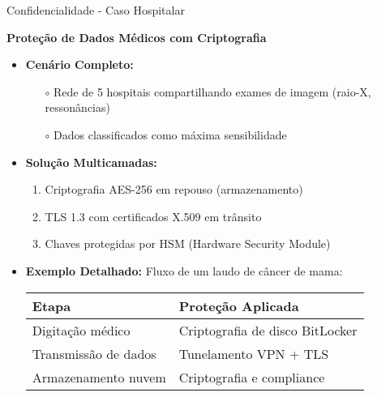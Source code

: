 \begin{frame}{Confidencialidade - Caso Hospitalar}
  \begin{block}{\textbf{Proteção de Dados Médicos com Criptografia}}
    \begin{itemize}
      \item \textbf{Cenário Completo:}
            \begin{itemize}
              \item[$\circ$] Rede de 5 hospitais compartilhando exames de imagem (raio-X, ressonâncias)
              \item[$\circ$] Dados classificados como máxima sensibilidade
            \end{itemize}

      \item \textbf{Solução Multicamadas:}
            \begin{enumerate}
              \item Criptografia AES-256 em repouso (armazenamento)
              \item TLS 1.3 com certificados X.509 em trânsito
              \item Chaves protegidas por HSM (Hardware Security Module)
            \end{enumerate}

      \item \textbf{Exemplo Detalhado:} Fluxo de um laudo de câncer de mama:

            \begin{tabular}{|l|l|}
              \hline
              \textbf{Etapa}       & \textbf{Proteção Aplicada}      \\ \hline
              Digitação médico     & Criptografia de disco BitLocker \\ \hline
              Transmissão de dados & Tunelamento VPN + TLS           \\ \hline
              Armazenamento nuvem  & Criptografia e compliance       \\ \hline
            \end{tabular}


    \end{itemize}
  \end{block}


\end{frame}
